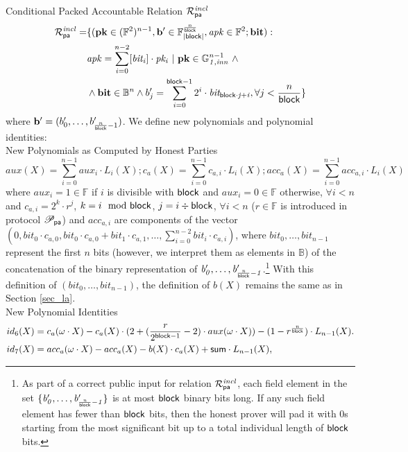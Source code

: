 \noindent \textsf{Conditional Packed Accountable Relation $\mathcal{R}^{\mathit{incl}}_{\mathsf{pa}}$} 
\begin{equation*}
\begin{split}
\mathcal{R}^{\mathit{incl}}_{\mathsf{pa}} = & \{(\mathbf{pk} \in (\mathbb{F}^2)^{n-1},\mathbf{b'} \in \mathbb{F}_{|\mathsf{block}|}^{\frac{n}{\mathsf{block}}},
\mathit{apk} \in \mathbb{F}^2; \mathbf{bit}) : \\ 
 & \mathit{apk} = \sum_{i=0}^{n-2} [\mathit{bit_i}] \cdot \mathit{pk_i} \ | \ \mathbf{pk} \in \mathbb{G}_{\mathit{1,inn}}^{n-1} \ \wedge \\
 & \wedge \mathbf{bit} \in \mathbb{B}^n  \wedge b'_{j} = \sum_{i=0}^{\mathsf{block} -1}2^i \cdot \mathit{bit_{\mathsf{block} \cdot j + i}}, \forall j < \frac{n}{\mathsf{block}} \} 
\end{split}
\end{equation*}
where $\mathbf{b'} = (b'_{0}, \ldots, b'_{{\frac{n}{\mathsf{block}}} -1})$. We define new polynomials and polynomial identities: \\

\noindent \textsf{New Polynomials as Computed by Honest Parties} 
$$ aux(X) = \sum_{i=0}^{n-1}aux_i \cdot L_i(X); c_{a}(X) = \sum_{i=0}^{n-1} c_{a,i} \cdot L_i(X); acc_{a}(X)  =  \sum_{i=0}^{n-1} acc_{a,i}  \cdot L_i(X)$$
\noindent where $aux_{i} = 1 \in \mathbb{F}$ if $i$ is divisible with $\mathsf{block}$ and $aux_{i} = 0 \in \mathbb{F}$ otherwise, $\forall i < n$ 
and $c_{a,i} = 2^k \cdot r^j$, $k = i \mod {\mathsf{block}}$, $j = i \div \mathsf{block}$, $\forall i < n$ ($r \in \mathbb{F}$ is introduced in protocol $\mathscr{P}_{\mathsf{pa}}$) and $acc_{a,i}$ are components of the vector $(0, \mathit{bit}_0 \cdot c_{a,0}, \mathit{bit}_0 \cdot c_{a,0}+ \mathit{bit}_1  \cdot c_{a,1}, \ldots, \sum_{i=0}^{n-2}\mathit{bit}_i \cdot c_{a,i})$, where $\mathit{bit_{0}}, \ldots, \mathit{bit_{n-1}}$ represent the first $n$ 
bits (however, we interpret them as elements in $\mathbb{B}$) of the concatenation of the binary representation of 
$\mathit{b'_{0}}, \ldots, \mathit{b'_{\frac{n}{\mathsf{block}}-1}}$.\footnote{As 
part of a correct public input for relation $\mathcal{R}^{\mathit{incl}}_{\mathsf{pa}}$, each field element in the set 
$\{\mathit{b'_{0}}, \ldots, \mathit{b'_{\frac{n}{\mathsf{block}}-1}} \}$ is at most $\mathsf{block}$ binary bits long. If any such field element has fewer than $\mathsf{block}$ bits, 
then the honest prover will pad it with $0$s starting from the most significant bit up to a total individual length of $\mathsf{block}$ bits.} 
With this definition of $(\mathit{bit_{0}}, \ldots, \mathit{bit_{n-1}})$, 
the definition of $b(X)$ remains the same as in Section \ref{sec_la}.\\

\noindent \textsf{New Polynomial Identities} 
\begin{align*}
id_6(X) & =  c_{a}(\omega \cdot X) - c_{a}(X)\cdot (2+ (\frac{r}{2^{\mathsf{block} -1}} -2) \cdot aux(\omega \cdot X)) - (1 - r^{\frac{n}{\mathsf{block}}}) \cdot L_{n-1}(X).\\
id_7(X) & =  acc_{a}(\omega \cdot X) - acc_{a}(X) - b(X)\cdot c_{a}(X) + \mathsf{sum} \cdot L_{n-1}(X),
\end{align*}


